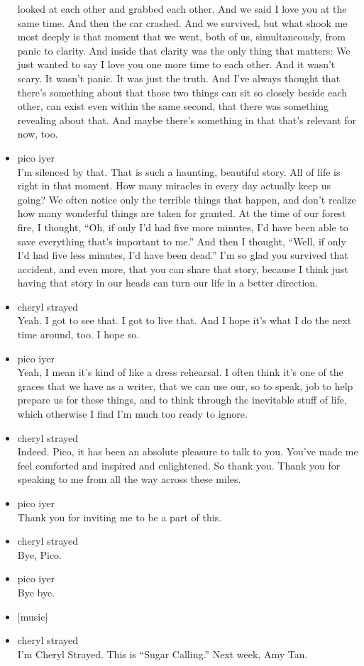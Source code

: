 \begin{itemize}
  looked at each other and grabbed each other. And we said I love you at
  the same time. And then the car crashed. And we survived, but what
  shook me most deeply is that moment that we went, both of us,
  simultaneously, from panic to clarity. And inside that clarity was the
  only thing that matters: We just wanted to say I love you one more
  time to each other. And it wasn't scary. It wasn't panic. It was just
  the truth. And I've always thought that there's something about that
  those two things can sit so closely beside each other, can exist even
  within the same second, that there was something revealing about that.
  And maybe there's something in that that's relevant for now, too.
\item
  pico iyer\\
  I'm silenced by that. That is such a haunting, beautiful story. All of
  life is right in that moment. How many miracles in every day actually
  keep us going? We often notice only the terrible things that happen,
  and don't realize how many wonderful things are taken for granted. At
  the time of our forest fire, I thought, ``Oh, if only I'd had five
  more minutes, I'd have been able to save everything that's important
  to me.'' And then I thought, ``Well, if only I'd had five less
  minutes, I'd have been dead.'' I'm so glad you survived that accident,
  and even more, that you can share that story, because I think just
  having that story in our heads can turn our life in a better
  direction.
\item
  cheryl strayed\\
  Yeah. I got to see that. I got to live that. And I hope it's what I do
  the next time around, too. I hope so.
\item
  pico iyer\\
  Yeah, I mean it's kind of like a dress rehearsal. I often think it's
  one of the graces that we have as a writer, that we can use our, so to
  speak, job to help prepare us for these things, and to think through
  the inevitable stuff of life, which otherwise I find I'm much too
  ready to ignore.
\item
  cheryl strayed\\
  Indeed. Pico, it has been an absolute pleasure to talk to you. You've
  made me feel comforted and inspired and enlightened. So thank you.
  Thank you for speaking to me from all the way across these miles.
\item
  pico iyer\\
  Thank you for inviting me to be a part of this.
\item
  cheryl strayed\\
  Bye, Pico.
\item
  pico iyer\\
  Bye bye.
\item
  {[}music{]}
\item
  cheryl strayed\\
  I'm Cheryl Strayed. This is ``Sugar Calling.'' Next week, Amy Tan.
\end{itemize}

